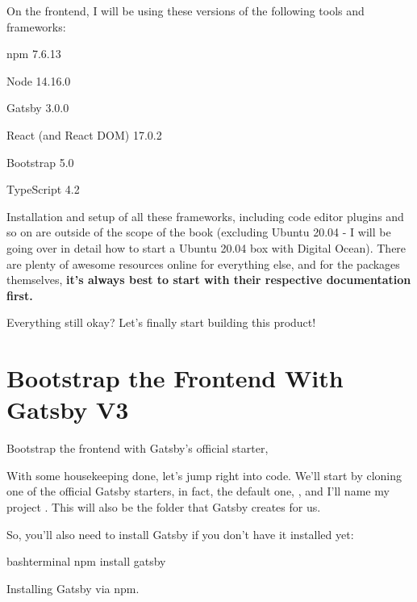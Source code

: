 \documentclass[paper=6in:9in,pagesize=pdftex,headinclude=on,footinclude=on,12pt,twoside]{scrbook}
\begin{document}

On the frontend, I will be using these versions of the following tools and frameworks:

\begin{arrows}
\item npm 7.6.13
\item Node 14.16.0
\item Gatsby 3.0.0
\item React (and React DOM) 17.0.2
\item Bootstrap 5.0
\item TypeScript 4.2
\end{arrows}

Installation and setup of all these frameworks, including code editor plugins and so on are outside of the scope of the book (excluding Ubuntu 20.04 - I will be going over in detail how to start a Ubuntu 20.04 box with Digital Ocean). There are plenty of awesome resources online for everything else, and for the packages themselves, \textbf{it's always best to start with their respective documentation first.}

Everything still okay? Let's finally start building this product!

\section{Bootstrap the Frontend With Gatsby V3}
\begin{arrows}
\item Bootstrap the frontend with Gatsby's official starter, 
\end{arrows}

With some housekeeping done, let's jump right into code. We'll start by cloning one of the official Gatsby starters, in fact, the default one, , and I'll name my project . This will also be the folder that Gatsby creates for us. 

So, you'll also need to install Gatsby if you don't have it installed yet:

\begin{listing}[H]
\begin{code}{bash}{terminal}
npm install gatsby
\end{code}
\caption{Installing Gatsby via npm.}
\end{listing}
\end{document}
